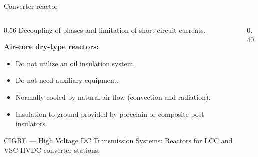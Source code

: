 
\begin{frame}{Converter reactor}
  \begin{columns}[c,onlytextwidth]
    \begin{column}{0.56\textwidth}
      Decoupling of phases and limitation of short-circuit currents.

      \vspace{0.6em}
      \textbf{Air-core dry-type reactors:}
      \begin{itemize}
        \setlength{\itemsep}{0.35em}
        \item Do not utilize an oil insulation system.
        \item Do not need auxiliary equipment.
        \item Normally cooled by natural air flow (convection and radiation).
        \item Insulation to ground provided by porcelain or composite post
              insulators.
      \end{itemize}
      \vspace{0.3em}
      {\color{atGray}\footnotesize CIGRE --- High Voltage DC Transmission
      Systems: Reactors for LCC and VSC HVDC converter stations.}
    \end{column}
    \begin{column}{0.40\textwidth}
      \centering
    \end{column}
  \end{columns}
\end{frame}
